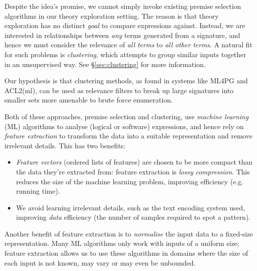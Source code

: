 Despite the idea's promise, we cannot simply invoke existing premise selection algorithms in our theory exploration setting. The reason is that theory exploration has no distinct \emph{goal} to compare expressions against. Instead, we are interested in relationships between \emph{any} terms generated from a signature, and hence we must consider the relevance of \emph{all terms} to \emph{all other terms}. A natural fit for such problems is \emph{clustering}, which attempts to group similar inputs together in an unsupervised way. See \S \ref{sec:clustering} for more information.

Our hypothesis is that clustering methods, as found in systems like ML4PG and ACL2(ml), can be used as relevance filters to break up large signatures into smaller sets more amenable to brute force enumeration.

\iffalse TODO: Signatures or terms? \fi

\iffalse TODO: I would play up the clustering intelligence. Clustering is not just about breaking up, it is about discovering significant patterns in data. By forgetting this, you make motivation for your work sound too ``small'' \fi

Both of these approaches, premise selection and clustering, use \emph{machine learning} (ML) algorithms to analyse (logical or software) \iffalse TODO: software vs logical expr? \fi expressions, and hence rely on \emph{feature extraction} to transform the data into a suitable representation and remove irrelevant details. This has two benefits:

\begin{itemize}
  \item \emph{Feature vectors} (ordered lists of features) are chosen to be more compact \iffalse TODO: unclear \fi than the data they're extracted from: feature extraction is \emph{lossy compression}. This reduces the size of the machine learning problem, improving efficiency (e.g. running time).
  \item We avoid learning irrelevant details, such as the text encoding system used, improving \emph{data} efficiency (the number of samples required to spot a pattern).
\end{itemize}

Another benefit of feature extraction is to \emph{normalise} the input data to a fixed-size representation. Many ML algorithms only work with inputs of a uniform size; feature extraction allows us to use these algorithms in domains where the size of each input is not known, may vary or may even be unbounded.

